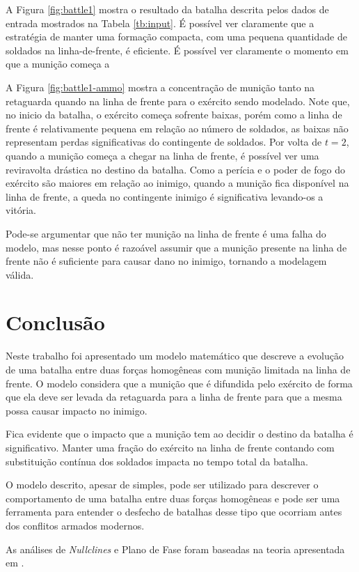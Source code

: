 \documentclass{article}
\begin{document}
A Figura \ref{fig:battle1} mostra o resultado da batalha descrita pelos dados de entrada mostrados na Tabela \ref{tb:input}. É possível ver claramente que a estratégia de manter uma formação compacta, com uma pequena quantidade de soldados na linha-de-frente, é eficiente. É possível ver claramente o momento em que a munição começa a 

A Figura \ref{fig:battle1-ammo} mostra a concentração de munição tanto na retaguarda quando na linha de frente para o exército sendo modelado. Note que, no inicio da batalha, o exército começa sofrente baixas, porém como a linha de frente é relativamente pequena em relação ao número de soldados, as baixas não representam perdas significativas do contingente de soldados. Por volta de $t = 2$, quando a munição começa a chegar na linha de frente, é possível ver uma reviravolta drástica no destino da batalha. Como a perícia e o poder de fogo do exército são maiores em relação ao inimigo, quando a munição fica disponível na linha de frente, a queda no contingente inimigo é significativa levando-os a vitória.

Pode-se argumentar que não ter munição na linha de frente é uma falha do modelo, mas nesse ponto é razoável assumir que a munição presente na linha de frente não é suficiente para causar dano no inimigo, tornando a modelagem válida.

\section{Conclusão}

Neste trabalho foi apresentado um modelo matemático que descreve a evolução de uma batalha entre duas forças homogêneas com munição limitada na linha de frente. O modelo considera que a munição que é difundida pelo exército de forma que ela deve ser levada da retaguarda para a linha de frente para que a mesma possa causar impacto no inimigo.

Fica evidente que o impacto que a munição tem ao decidir o destino da batalha é significativo. Manter uma fração do exército na linha de frente contando com substituição contínua dos soldados impacta no tempo total da batalha.

O modelo descrito, apesar de simples, pode ser utilizado para descrever o comportamento de uma batalha entre duas forças homogêneas e pode ser uma ferramenta para entender o desfecho de batalhas desse tipo que ocorriam antes dos conflitos armados modernos.

As análises de \textit{Nullclines} e Plano de Fase foram baseadas na teoria apresentada em \cite{chaos}.
\end{document}

